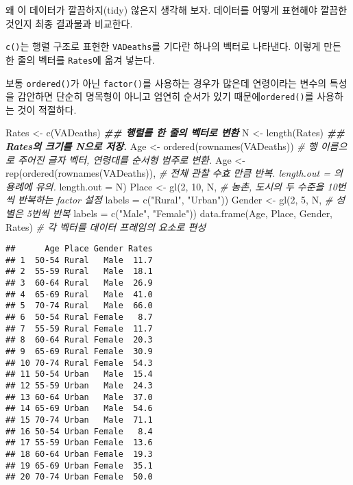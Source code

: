 \documentclass[
]{article}
\newenvironment{Shaded}{\begin{snugshade}}{\end{snugshade}}
\newcommand{\AttributeTok}[1]{\textcolor[rgb]{0.77,0.63,0.00}{#1}}
\newcommand{\CommentTok}[1]{\textcolor[rgb]{0.56,0.35,0.01}{\textit{#1}}}
\newcommand{\DecValTok}[1]{\textcolor[rgb]{0.00,0.00,0.81}{#1}}
\newcommand{\DocumentationTok}[1]{\textcolor[rgb]{0.56,0.35,0.01}{\textbf{\textit{#1}}}}
\newcommand{\FunctionTok}[1]{\textcolor[rgb]{0.00,0.00,0.00}{#1}}
\newcommand{\NormalTok}[1]{#1}
\newcommand{\OtherTok}[1]{\textcolor[rgb]{0.56,0.35,0.01}{#1}}
\newcommand{\StringTok}[1]{\textcolor[rgb]{0.31,0.60,0.02}{#1}}
\begin{document}
왜 이 데이터가 깔끔하지(tidy) 않은지 생각해 보자. 데이터를 어떻게
표현해야 깔끔한 것인지 최종 결과물과 비교한다.

\texttt{c()}는 행렬 구조로 표현한 \texttt{VADeaths}를 기다란 하나의
벡터로 나타낸다. 이렇게 만든 한 줄의 벡터를 \texttt{Rates}에 옮겨
넣는다.

보통 \texttt{ordered()}가 아닌 \texttt{factor()}를 사용하는 경우가
많은데 연령이라는 변수의 특성을 감안하면 단순히 명목형이 아니고 엄연히
순서가 있기 때문에\texttt{ordered()}를 사용하는 것이 적절하다.

\begin{Shaded}
\begin{Highlighting}[]
\NormalTok{Rates }\OtherTok{\textless{}{-}} \FunctionTok{c}\NormalTok{(VADeaths)  }\DocumentationTok{\#\# 행렬를 한 줄의 벡터로 변환 }
\NormalTok{N }\OtherTok{\textless{}{-}} \FunctionTok{length}\NormalTok{(Rates) }\DocumentationTok{\#\# \textasciigrave{}Rates\textasciigrave{}의 크기를 \textasciigrave{}N\textasciigrave{}으로 저장.}
\NormalTok{Age }\OtherTok{\textless{}{-}} \FunctionTok{ordered}\NormalTok{(}\FunctionTok{rownames}\NormalTok{(VADeaths)) }\CommentTok{\# 행 이름으로 주어진 글자 벡터, 연령대를 순서형 범주로 변환. }
\NormalTok{Age }\OtherTok{\textless{}{-}} \FunctionTok{rep}\NormalTok{(}\FunctionTok{ordered}\NormalTok{(}\FunctionTok{rownames}\NormalTok{(VADeaths)), }\CommentTok{\# 전체 관찰 수효 만큼 반복. \textasciigrave{}length.out = \textasciigrave{}의 용례에 유의. }
           \AttributeTok{length.out =}\NormalTok{ N)}
\NormalTok{Place }\OtherTok{\textless{}{-}} \FunctionTok{gl}\NormalTok{(}\DecValTok{2}\NormalTok{, }\DecValTok{10}\NormalTok{, N, }\CommentTok{\# 농촌, 도시의 두 수준을 10번씩 반복하는 \textasciigrave{}factor\textasciigrave{} 설정}
           \AttributeTok{labels =} \FunctionTok{c}\NormalTok{(}\StringTok{"Rural"}\NormalTok{, }\StringTok{"Urban"}\NormalTok{))}
\NormalTok{Gender }\OtherTok{\textless{}{-}} \FunctionTok{gl}\NormalTok{(}\DecValTok{2}\NormalTok{, }\DecValTok{5}\NormalTok{, N, }\CommentTok{\# 성별은 5번씩 반복 }
             \AttributeTok{labels =} \FunctionTok{c}\NormalTok{(}\StringTok{"Male"}\NormalTok{, }\StringTok{"Female"}\NormalTok{))}
\FunctionTok{data.frame}\NormalTok{(Age, Place, Gender, Rates) }\CommentTok{\# 각 벡터를 데이터 프레임의 요소로 편성}
\end{Highlighting}
\end{Shaded}

\begin{verbatim}
##      Age Place Gender Rates
## 1  50-54 Rural   Male  11.7
## 2  55-59 Rural   Male  18.1
## 3  60-64 Rural   Male  26.9
## 4  65-69 Rural   Male  41.0
## 5  70-74 Rural   Male  66.0
## 6  50-54 Rural Female   8.7
## 7  55-59 Rural Female  11.7
## 8  60-64 Rural Female  20.3
## 9  65-69 Rural Female  30.9
## 10 70-74 Rural Female  54.3
## 11 50-54 Urban   Male  15.4
## 12 55-59 Urban   Male  24.3
## 13 60-64 Urban   Male  37.0
## 14 65-69 Urban   Male  54.6
## 15 70-74 Urban   Male  71.1
## 16 50-54 Urban Female   8.4
## 17 55-59 Urban Female  13.6
## 18 60-64 Urban Female  19.3
## 19 65-69 Urban Female  35.1
## 20 70-74 Urban Female  50.0
\end{verbatim}
\end{document}
